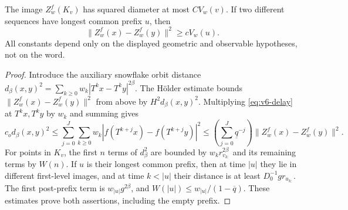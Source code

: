 \begin{lemma}\label{lem:v6-cylinders}
The image $Z_w^f(K_v)$ has squared diameter at most $C V_w(v)$.
If two different sequences have longest common prefix $u$, then
\begin{equation}
        \|Z_w^f(x)-Z_w^f(y)\|^2\ge c V_w(u).             \label{eq:v6-separation}
\end{equation}
All constants depend only on the displayed geometric and observable
hypotheses, not on the word.
\end{lemma}
\begin{proof}
Introduce the auxiliary snowflake orbit distance
$d_\beta(x,y)^2=\sum_{k\ge0}w_k|T^kx-T^ky|^{2\beta}$.
The H\"older estimate bounds $\|Z_w^f(x)-Z_w^f(y)\|^2$ from above
by $H^2d_\beta(x,y)^2$. Multiplying \eqref{eq:v6-delay} at $T^kx,T^ky$
by $w_k$ and summing gives
\[
 c_od_\beta(x,y)^2\le
 \sum_{j=0}^J\sum_{k\ge0}w_k
       |f(T^{k+j}x)-f(T^{k+j}y)|^2
 \le\left(\sum_{j=0}^J\underline q^{-j}\right)
       \|Z_w^f(x)-Z_w^f(y)\|^2.
\]
For points in $K_v$, the first $n$ terms of $d_\beta^2$ are bounded
by $w_kr_{v_{k:}}^{2\beta}$ and its remaining terms by $W(n)$.
If $u$ is their longest common prefix, then at time $|u|$ they lie
in different first-level images, and at time $k<|u|$ their distance
is at least $D_0^{-1}g r_{u_{k:}}$. The first post-prefix term is
$w_{|u|}g^{2\beta}$, and $W(|u|)\le w_{|u|}/(1-\overline q)$.
These estimates prove both assertions, including the empty prefix.
\end{proof}

